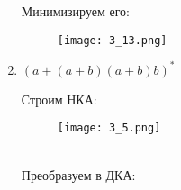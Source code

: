 \documentclass[12pt, a4paper]{article}
\begin{document}
\begin{enumerate}
Минимизируем его:

\begin{comment}
digraph {
    rankdir="LR"
    "" [shape=point]
    q1 [shape=circle]
    "{q6q8, q2q8, q6}" [shape=doublecircle]
    "q3q7, q5" [shape=circle]
    q4 [shape=circle]

    "" -> q1
    q1 -> "{q6q8, q2q8, q6}"  [label="a"]
    "{q6q8, q2q8, q6}" -> "q3q7, q5" [label="a"]
    "q3q7, q5" -> "{q6q8, q2q8, q6}" [label="b"]
    "q3q7, q5" -> q4 [label="a"]
    q4 -> "q3q7, q5" [label="b"]
}
\end{comment}

    \begin{figure}[H]
        \centering
        \texttt{[image: 3\_13.png]}
    \end{figure}


    \item \((a+(a+b)(a+b)b)^*\)
    
\begin{comment}
digraph {
    rankdir="LR"
    "" [shape=point]
    q1 [shape=doublecircle]
    q2 [shape=circle]
    q3 [shape=circle]

    "" -> q1
    q1 -> q1 [label="a"]
    q1 -> q2 [label="a,b"]
    q2 -> q3 [label="a,b"]
    q3 -> q1 [label="b"]
}
\end{comment}

Строим НКА:

    \begin{figure}[H]
        \centering
        \texttt{[image: 3\_5.png]}
    \end{figure}
    
\\Преобразуем в ДКА:

\begin{comment}
digraph {
    rankdir="LR"
    "" [shape=point]
    q1 [shape=doublecircle]
    "{q1q2}" [shape=doublecircle]
    q2 [shape=circle]
    "{q1,q2,q3}" [shape=doublecircle]
    "{q2,q3}" [shape=circle]
    "{q1q3}" [shape=doublecircle]
    q3 [shape=circle]

    "" -> q1
    q1 -> "{q1q2}" [label="a"]
    q1 -> q2 [label="b"]
    "{q1q2}" -> "{q1,q2,q3}" [label="a"]
    "{q1,q2,q3}" -> "{q1,q2,q3}" [label="a,b"]
    "{q1q2}" -> "{q2,q3}" [label="b"]
    "{q2,q3}" -> "{q1q3}" [label="b"]
    "{q1q3}" -> "{q1q2}" [label="a,b"]
    q2 -> q3 [label="a,b"]
    q3 -> q1 [label="b"]
}
\end{comment}


\end{enumerate}
\end{document}

